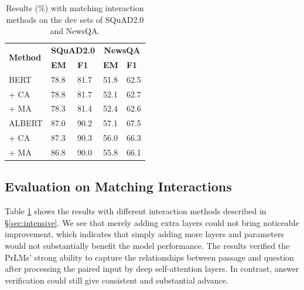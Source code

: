 \documentclass[letterpaper]{article} %
\begin{document}
\begin{table}
	\begin{center}
		\setlength{\tabcolsep}{10pt}
		{
			\begin{tabular}{lllll}
				\toprule
				\multirow{2}{*}{\textbf{Method}} & \multicolumn{2}{c}{\textbf{SQuAD2.0}} & \multicolumn{2}{c}{\textbf{NewsQA}} \\
				& \textbf{EM} & \textbf{F1} & \textbf{EM} & \textbf{F1} \\
				\midrule
				BERT &  78.8 & 81.7 & 51.8 & 62.5 \\
				\quad     + CA &  78.8 & 81.7 & 52.1 & 62.7\\
				\quad     + MA  &  78.3  & 81.4  & 52.4 & 62.6 \\
				\midrule
				ALBERT & 87.0 & 90.2 & 57.1 & 67.5\\
				\quad     + CA & 87.3 & 90.3  & 56.0 & 66.3  \\
				\quad     + MA  & 86.8 & 90.0  & 55.8 & 66.1  \\
				\bottomrule
			\end{tabular}
		}
	\end{center}
	\caption{\label{tableatt} Results (\%) with matching interaction methods on the dev sets of SQuAD2.0 and NewsQA.}
\end{table}
\subsection{Evaluation on Matching Interactions}
Table \ref{tableatt} shows the results with different interaction methods described in \S\ref{sec:intensive}.
We see that merely adding extra layers could not bring noticeable improvement, which indicates that simply adding more layers and parameters would not substantially benefit the model performance. The results verified the PrLMs' strong ability to capture the relationships between passage and question after processing the paired input by deep self-attention layers. In contrast, answer verification could still give consistent and substantial advance.
\end{document}
